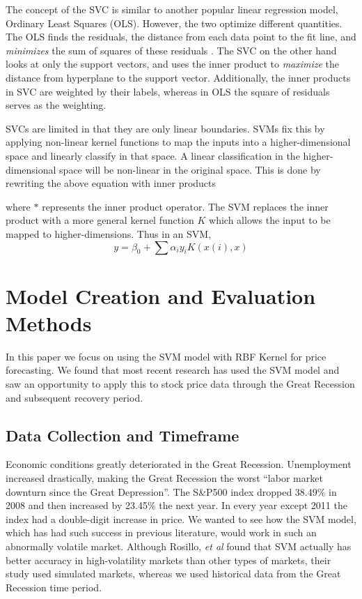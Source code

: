 \documentclass[pageno]{jpaper}
\begin{document}
The concept of the SVC is similar to another popular linear regression model, Ordinary Least Squares (OLS). However, the two optimize different quantities. The OLS finds the residuals, the distance from each data point to the fit line, and {\em minimizes} the sum of squares of these residuals \cite{watson}. The SVC on the other hand looks at only the support vectors, and uses the inner product to {\em maximize} the distance from hyperplane to the support vector. Additionally, the inner products in SVC are weighted by their labels, whereas in OLS the square of residuals serves as the weighting.

SVCs are limited in that they are only linear boundaries. SVMs fix this by applying non-linear kernel functions to map the inputs into a higher-dimensional space and linearly classify in that space. A linear classification in the higher-dimensional space will be non-linear in the original space. This is done by rewriting the above equation with inner products

where $*$ represents the inner product operator. The SVM replaces the inner product with a more general kernel function $K$ which allows the input to be mapped to higher-dimensions. Thus in an SVM,
$$y = \beta_0 + \sum \alpha_i y_i K(x(i),x)$$

\section{Model Creation and Evaluation Methods}
In this paper we focus on using the SVM model with RBF Kernel for price forecasting. We found that most recent research has used the SVM model and saw an opportunity to apply this to stock price data through the Great Recession and subsequent recovery period. 

\subsection{Data Collection and Timeframe}
\label{subsec: data}
Economic conditions greatly deteriorated in the Great Recession. Unemployment increased drastically, making the Great Recession the worst ``labor market downturn since the Great Depression''\cite{katz}. The S\&P500 index dropped 38.49\% in 2008 and then increased by 23.45\% the next year\cite{sp500returns}. In every year except 2011 the index had a double-digit increase in price. We wanted to see how the SVM model, which has had such success in previous literature, would work in such an abnormally volatile market. Although Rosillo, {\em et al} found that SVM actually has better accuracy in high-volatility markets than other types of markets, their study used simulated markets, whereas we used historical data from the Great Recession time period\cite{rosillo}.
\end{document}
